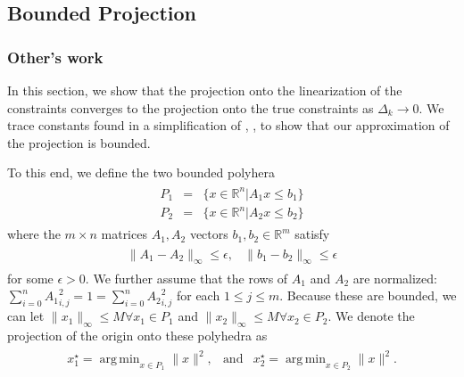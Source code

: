 \documentclass{article}
\theoremstyle{case}
\newcommand{\dmax}{\Delta_{\text{max}}}
\DeclareMathOperator*{\argmin}{arg\,min}
\newcommand{\Rn}{\mathbb R^n}
\newcommand{\Rm}{\mathbb R^m}
\newcommand{\naturals}{\mathbb N}
\newcommand{\dk}{\Delta_k}
\begin{document}




\subsection{Bounded Projection}

\subsubsection{Other's work}

In this section, we show that the projection onto the linearization of the constraints converges to the projection onto the true constraints as $\dk \to 0$.
We trace constants found in a simplification of \cite{dummy:hoffman}, \cite{dummy:continuity_of_inverse}, \cite{dummy:perturbations} to show that our approximation of the projection is bounded.

To this end, we define the two bounded polyhera
\begin{align*}
\begin{array}{ccc}
P_1 &=& \{ x \in \Rn | A_1x\le b_1 \} \\
P_2 &=& \{ x \in \Rn | A_2x\le b_2 \}
\end{array}
\end{align*}
where the $m\times n$ matrices $A_1, A_2$ vectors $b_1, b_2 \in \Rm$  satisfy
\begin{align*}
\begin{array}{cc}
\|A_1 - A_2\|_{\infty} \le \epsilon, & \|b_1 - b_2\|_{\infty} \le \epsilon
\end{array}
\end{align*}
for some $\epsilon > 0$.
We further assume that the rows of $A_1$ and $A_2$ are normalized: $\sum_{i = 0}^n{A_1}_{i,j}^2 = 1 = \sum_{i = 0}^n{A_2}_{i,j}^2$ for each $1 \le j \le m$.
Because these are bounded, we can let $\|x_1\|_{\infty} \le M \forall x_1 \in P_1$ and $\|x_2\|_{\infty} \le M \forall x_2 \in P_2$.
We denote the projection of the origin onto these polyhedra as
\begin{align*}
\begin{array}{ccc}
x_1^{\star} = \argmin_{x\in P_1}\|x\|^2, &\textrm{and} & x_2^{\star} = \argmin_{x\in P_2}\|x\|^2.
\end{array}
\end{align*}
\end{document}
